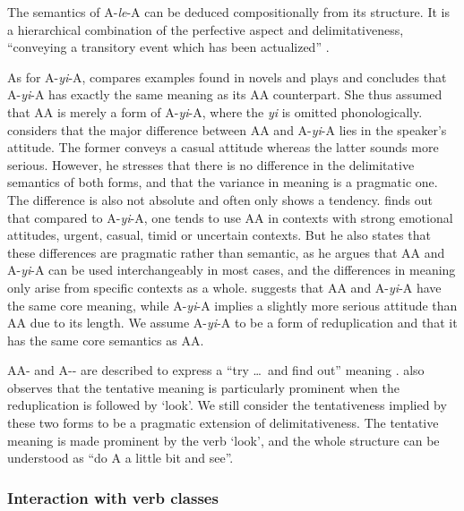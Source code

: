 The semantics of A-\textit{le}-A can be deduced compositionally from its structure. 
It is a hierarchical combination of the perfective aspect and delimitativeness, ``conveying a transitory event which has been actualized'' \citep[151]{XiaoMcEnery2004}.


As for A-\textit{yi}-A, \citet[273]{Fan1964} compares examples found in novels and plays and concludes that A-\textit{yi}-A has exactly the same meaning as its AA counterpart.
She thus assumed that AA is merely a form of A-\textit{yi}-A, where the \textit{yi} is omitted phonologically.
\citet[Sec.\,5]{Xing2000} considers that the major  difference  between AA and A-\textit{yi}-A lies in the speaker's attitude.
The former conveys a casual attitude whereas the latter sounds more serious. %
However, he stresses that there is no difference in the delimitative semantics of both forms,
and that the variance in meaning is a pragmatic one.
The difference is also not absolute and often only shows a tendency.
\citet{Xu2002} finds out that compared to A-\textit{yi}-A, one tends to use AA in contexts with strong emotional attitudes, urgent, casual, timid or uncertain contexts.
But he also states that these differences are pragmatic rather than semantic, 
as he argues that AA and A-\textit{yi}-A can be used interchangeably in most cases,
and the differences in meaning only arise from specific contexts as a whole.
\citet[15]{Yang2003} suggests that AA and A-\textit{yi}-A have the same core meaning, while A-\textit{yi}-A implies a slightly more serious attitude than AA due to its length.
We assume A-\textit{yi}-A to be a form of reduplication and that it has the same core semantics as AA.

AA- and A-- are described to express a ``try \ldots\, and find out'' meaning \citep[63]{Cheng2012}.
\citet[290]{Tsao2001} also observes that the tentative meaning is particularly prominent when the reduplication is followed by  `look'.
We still consider the tentativeness implied by these two forms to be a pragmatic extension of delimitativeness.
The tentative meaning is made prominent by the verb  `look',
and the whole structure can be understood as ``do A a little bit and see''.




\subsubsection{Interaction with verb classes}\label{sec:Aktionsarten}

